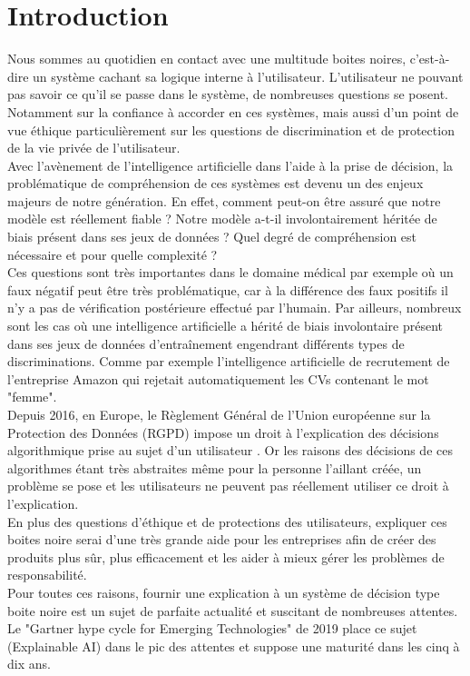 \chapter*{Introduction}
\label{chap:introduction}
\vspace{5mm}
Nous sommes au quotidien en contact avec une multitude boites noires, c’est-à-dire un système cachant sa logique interne à l’utilisateur. L’utilisateur ne pouvant pas savoir ce qu’il se passe dans le système, de nombreuses questions se posent. Notamment sur la confiance à accorder en ces systèmes, mais aussi d’un point de vue éthique particulièrement sur les questions de discrimination et de protection de la vie privée de l’utilisateur.\\

Avec l’avènement de l’intelligence artificielle dans l’aide à la prise de décision, la problématique de compréhension de ces systèmes est devenu un des enjeux majeurs de notre génération. En effet, comment peut-on être assuré que notre modèle est réellement fiable ? Notre modèle a-t-il involontairement héritée de biais présent dans ses jeux de données ? Quel degré de compréhension est nécessaire et pour quelle complexité ?\\
Ces questions sont très importantes dans le domaine médical par exemple où un faux négatif peut être très problématique, car à la différence des faux positifs il n'y a pas de vérification postérieure effectué par l'humain. Par ailleurs, nombreux sont les cas où une intelligence artificielle a hérité de biais involontaire présent dans ses jeux de données d'entraînement engendrant différents types de discriminations. Comme par exemple l'intelligence artificielle de recrutement de l'entreprise Amazon qui rejetait automatiquement les CVs contenant le mot "femme".\\

Depuis 2016, en Europe, le Règlement Général de l'Union européenne sur la Protection des Données (RGPD) impose un droit à l'explication des décisions algorithmique prise au sujet d'un utilisateur \cite{RGPDexplanRight}. Or les raisons des décisions de ces algorithmes étant très abstraites même pour la personne l'aillant créée, un problème se pose et les utilisateurs ne peuvent pas réellement utiliser ce droit à l'explication.\\

En plus des questions d'éthique et de protections des utilisateurs, expliquer ces boites noire serai d'une très grande aide pour les entreprises afin de créer des produits plus sûr, plus efficacement et les aider à mieux gérer les problèmes de responsabilité.\\
Pour toutes ces raisons, fournir une explication à un système de décision type boite noire est un sujet de parfaite actualité et suscitant de nombreuses attentes. Le "Gartner hype cycle for Emerging Technologies" de 2019 place ce sujet (Explainable AI) dans le pic des attentes et suppose une maturité dans les cinq à dix ans.\\ 

